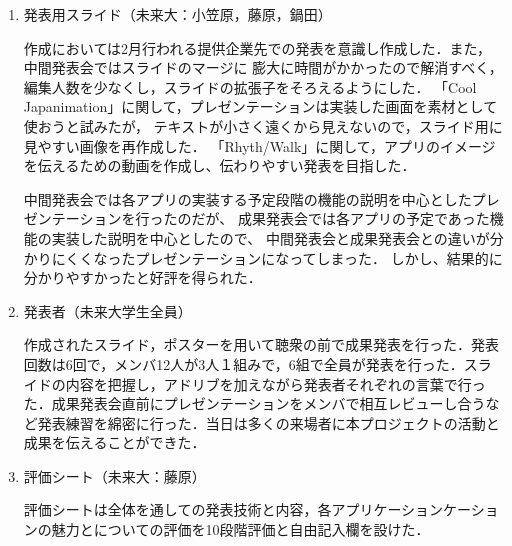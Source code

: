 \begin{enumerate}
\item 発表用スライド（未来大：小笠原，藤原，鍋田）
\par
作成においては2月行われる提供企業先での発表を意識し作成した．また，中間発表会ではスライドのマージに
膨大に時間がかかったので解消すべく，編集人数を少なくし，スライドの拡張子をそろえるようにした．
「Cool Japanimation」に関して，プレゼンテーションは実装した画面を素材として使おうと試みたが，
テキストが小さく遠くから見えないので，スライド用に見やすい画像を再作成した．
「Rhyth/Walk」に関して，アプリのイメージを伝えるための動画を作成し、伝わりやすい発表を目指した．
\par
中間発表会では各アプリの実装する予定段階の機能の説明を中心としたプレゼンテーションを行ったのだが、
成果発表会では各アプリの予定であった機能の実装した説明を中心としたので、
中間発表会と成果発表会との違いが分かりにくくなったプレゼンテーションになってしまった．
しかし、結果的に分かりやすかったと好評を得られた．

\item 発表者（未来大学生全員）
\par
作成されたスライド，ポスターを用いて聴衆の前で成果発表を行った．発表回数は6回で，メンバ12人が3人１組みで，6組で全員が発表を行った．スライドの内容を把握し，アドリブを加えながら発表者それぞれの言葉で行った．成果発表会直前にプレゼンテーションをメンバで相互レビューし合うなど発表練習を綿密に行った．当日は多くの来場者に本プロジェクトの活動と成果を伝えることができた．
\item 評価シート（未来大：藤原）
\par
評価シートは全体を通しての発表技術と内容，各アプリケーションケーションの魅力とについての評価を10段階評価と自由記入欄を設けた．


\end{enumerate}
